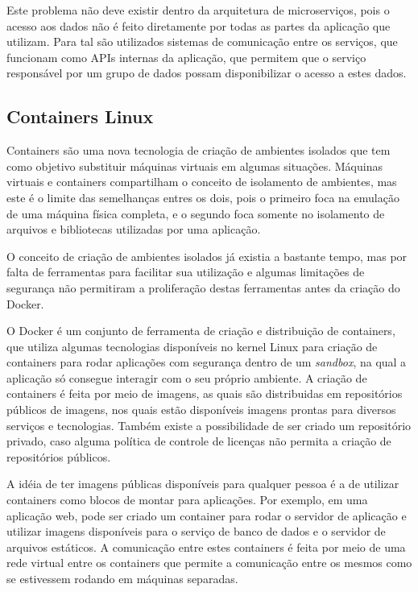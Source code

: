 Este problema não deve existir dentro da arquitetura de microserviços, pois o
acesso aos dados não é feito diretamente por todas as partes da aplicação que
utilizam. Para tal são utilizados sistemas de comunicação entre os serviços,
que funcionam como \acp{API} internas da aplicação, que permitem que o serviço
responsável por um grupo de dados possam disponibilizar o acesso a estes dados.

\subsection{Containers Linux}

Containers são uma nova tecnologia de criação de ambientes isolados que tem
como objetivo substituir máquinas virtuais em algumas situações. Máquinas
virtuais e containers compartilham o conceito de isolamento de ambientes, mas
este é o limite das semelhanças entres os dois, pois o primeiro foca na
emulação de uma máquina física completa, e o segundo foca somente no
isolamento de arquivos e bibliotecas utilizadas por uma aplicação.

O conceito de criação de ambientes isolados já existia a bastante tempo, mas
por falta de ferramentas para facilitar sua utilização e algumas limitações
de segurança não permitiram a proliferação destas ferramentas antes da criação
do Docker.

O Docker é um conjunto de ferramenta de criação e distribuição de containers,
que utiliza algumas tecnologias disponíveis no kernel Linux para criação de
containers para rodar aplicações com segurança dentro de um \emph{sandbox},
na qual a aplicação só consegue interagir com o seu próprio ambiente. A criação
de containers é feita por meio de imagens, as quais são distribuidas em
repositórios públicos de imagens, nos quais estão disponíveis imagens prontas
para diversos serviços e tecnologias. Também existe a possibilidade de ser
criado um repositório privado, caso alguma política de controle de licenças
não permita a criação de repositórios públicos.

A idéia de ter imagens públicas disponíveis para qualquer pessoa é a de
utilizar containers como blocos de montar para aplicações. Por exemplo,
em uma aplicação web, pode ser criado um container para rodar o servidor de
aplicação e utilizar imagens disponíveis para o serviço de banco de dados e
o servidor de arquivos estáticos. A comunicação entre estes containers é feita
por meio de uma rede virtual entre os containers que permite a comunicação
entre os mesmos como se estivessem rodando em máquinas separadas.

